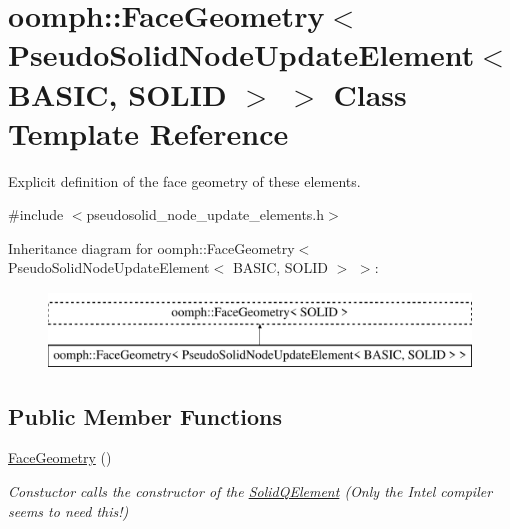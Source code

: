 \hypertarget{classoomph_1_1FaceGeometry_3_01PseudoSolidNodeUpdateElement_3_01BASIC_00_01SOLID_01_4_01_4}{}\section{oomph\+:\+:Face\+Geometry$<$ Pseudo\+Solid\+Node\+Update\+Element$<$ B\+A\+S\+IC, S\+O\+L\+ID $>$ $>$ Class Template Reference}
\label{classoomph_1_1FaceGeometry_3_01PseudoSolidNodeUpdateElement_3_01BASIC_00_01SOLID_01_4_01_4}


Explicit definition of the face geometry of these elements.  




{\ttfamily \#include $<$pseudosolid\+\_\+node\+\_\+update\+\_\+elements.\+h$>$}

Inheritance diagram for oomph\+:\+:Face\+Geometry$<$ Pseudo\+Solid\+Node\+Update\+Element$<$ B\+A\+S\+IC, S\+O\+L\+ID $>$ $>$\+:\begin{figure}[H]
\begin{center}
\leavevmode
\includegraphics[height=2.000000cm]{classoomph_1_1FaceGeometry_3_01PseudoSolidNodeUpdateElement_3_01BASIC_00_01SOLID_01_4_01_4}
\end{center}
\end{figure}
\subsection*{Public Member Functions}
\begin{DoxyCompactItemize}
\item 
\hyperlink{classoomph_1_1FaceGeometry_3_01PseudoSolidNodeUpdateElement_3_01BASIC_00_01SOLID_01_4_01_4_aca4982e3df0a3293daf1192aa380f5a3}{Face\+Geometry} ()
\begin{DoxyCompactList}\small\item\em Constuctor calls the constructor of the \hyperlink{classoomph_1_1SolidQElement}{Solid\+Q\+Element} (Only the Intel compiler seems to need this!) \end{DoxyCompactList}\end{DoxyCompactItemize}


